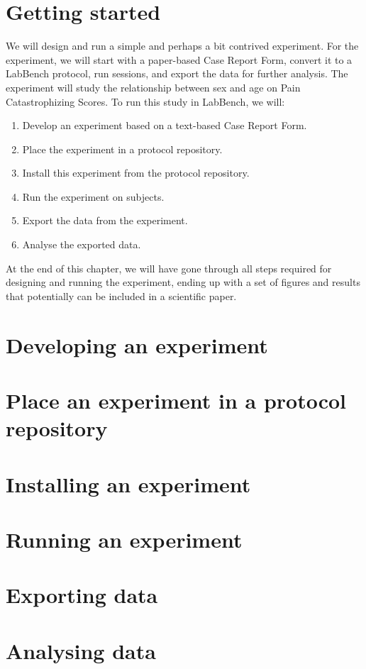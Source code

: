 \section{Getting started}

We will design and run a simple and perhaps a bit contrived experiment. For the experiment, we will start with a paper-based Case Report Form, convert it to a LabBench protocol, run sessions, and export the data for further analysis. The experiment will study the relationship between sex and age on Pain Catastrophizing Scores. To run this study in LabBench, we will:

\begin{enumerate}
\item Develop an experiment based on a text-based Case Report Form.
\item Place the experiment in a protocol repository.
\item Install this experiment from the protocol repository.
\item Run the experiment on subjects.
\item Export the data from the experiment.
\item Analyse the exported data. 
\end{enumerate}   

At the end of this chapter, we will have gone through all steps required for designing and running the experiment, ending up with a set of figures and results that potentially can be included in a scientific paper.

\section{Developing an experiment}


\section{Place an experiment in a protocol repository}


\section{Installing an experiment}


\section{Running an experiment}


\section{Exporting data}


\section{Analysing data}

